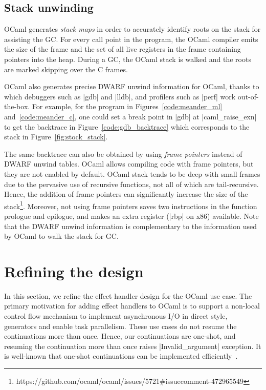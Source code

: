 \documentclass[sigplan,10pt,review,anonymous]{acmart}\settopmatter{printfolios=true,printccs=false,printacmref=false}
\begin{document}
\subsection{Stack unwinding}
\label{sec:unwind}

OCaml generates \emph{stack maps} in order to accurately identify roots on the
stack for assisting the GC. For every call point in the program, the OCaml
compiler emits the size of the frame and the set of all live registers in the
frame containing pointers into the heap. During a GC, the OCaml stack is walked
and the roots are marked skipping over the C frames.

OCaml also generates precise DWARF unwind information for OCaml, thanks to
which debuggers such as |gdb| and |lldb|, and profilers such as |perf| work
out-of-the-box. For example, for the program in Figures~\ref{code:meander_ml}
and~\ref{code:meander_c}, one could set a break point in |gdb| at
|caml_raise_exn| to get the backtrace in Figure~\ref{code:gdb_backtrace} which
corresponds to the stack in Figure~\ref{fig:stock_stack}.

The same backtrace can also be obtained by using \emph{frame pointers} instead
of DWARF unwind tables. OCaml allows compiling code with frame pointers, but
they are not enabled by default. OCaml stack tends to be deep with small frames
due to the pervasive use of recursive functions, not all of which are
tail-recursive. Hence, the addition of frame pointers can significantly
increase the size of the
stack\footnote{https://github.com/ocaml/ocaml/issues/5721\#issuecomment-472965549}.
Moreover, not using frame pointers saves two instructions in the function
prologue and epilogue, and makes an extra register (|rbp| on x86) available.
Note that the DWARF unwind information is complementary to the information used
by OCaml to walk the stack for GC.

\section{Refining the design}
\label{sec:refine}

In this section, we refine the effect handler design for the OCaml use case. The
primary motivation for adding effect handlers to OCaml is to support a non-local
control flow mechanism to implement asynchronous I/O in direct style, generators
and enable task parallelism. These use cases do not resume the continuations
more than once. Hence, our continuations are one-shot, and resuming the
continuation more than once raises |Invalid_argument| exception. It is
well-known that one-shot continuations can be implemented
efficiently~\cite{Bruggeman96}.
\end{document}

